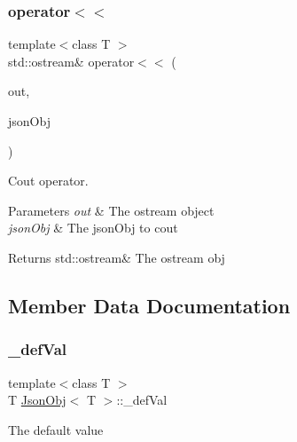 \subsubsection{\texorpdfstring{operator$<$$<$}{operator<<}}
{\footnotesize\ttfamily template$<$class T $>$ \\
std\+::ostream\& operator$<$$<$ (\begin{DoxyParamCaption}\item[{std\+::ostream \&}]{out,  }\item[{const \hyperlink{class_json_obj}{Json\+Obj}$<$ T $>$ \&}]{json\+Obj }\end{DoxyParamCaption})\hspace{0.3cm}{\ttfamily [friend]}}



Cout operator. 


\begin{DoxyParams}{Parameters}
{\em out} & The ostream object \\
\hline
{\em json\+Obj} & The json\+Obj to cout \\
\hline
\end{DoxyParams}
\begin{DoxyReturn}{Returns}
std\+::ostream\& The ostream obj 
\end{DoxyReturn}


\subsection{Member Data Documentation}
\mbox{\label{class_json_obj_af268190a877ab77610f43fc498feb564}} 
\subsubsection{\texorpdfstring{\+\_\+def\+Val}{\_defVal}}
{\footnotesize\ttfamily template$<$class T $>$ \\
T \hyperlink{class_json_obj}{Json\+Obj}$<$ T $>$\+::\+\_\+def\+Val\hspace{0.3cm}{\ttfamily [protected]}}

The default value \mbox{\label{class_json_obj_a0ab1dd0969845a76f67b199edd1af1d1}} 
